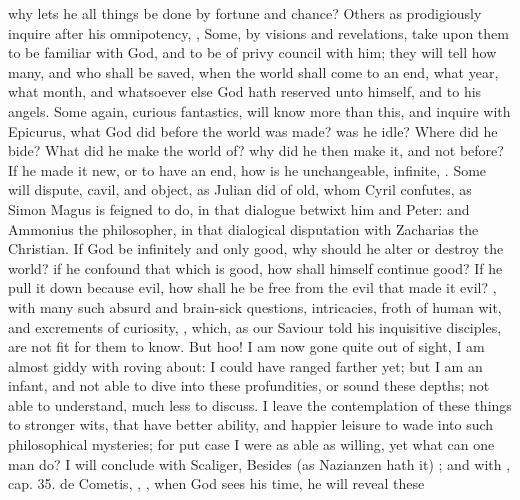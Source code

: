 {why lets he all things be done by fortune and chance? Others as
prodigiously inquire after his omnipotency,  \etc{},  Some, by visions and revelations, take upon them to be
familiar with God, and to be of privy council with him; they will tell
how many, and who shall be saved, when the world shall come to an end,
what year, what month, and whatsoever else God hath reserved unto
himself, and to his angels. Some again, curious fantastics, will know
more than this, and inquire with Epicurus, what God did before
the world was made? was he idle? Where did he bide? What did he make
the world of? why did he then make it, and not before? If he made it
new, or to have an end, how is he unchangeable, infinite, \etc{}. Some will
dispute, cavil, and object, as Julian did of old, whom Cyril confutes,
as Simon Magus is feigned to do, in that dialogue betwixt him and
Peter: and Ammonius the philosopher, in that dialogical disputation
with Zacharias the Christian. If God be infinitely and only good, why
should he alter or destroy the world? if he confound that which is
good, how shall himself continue good? If he pull it down because evil,
how shall he be free from the evil that made it evil? \etc{}, with many
such absurd and brain-sick questions, intricacies, froth of human wit,
and excrements of curiosity, \etc{}, which, as our Saviour told his
inquisitive disciples, are not fit for them to know. But hoo! I am now
gone quite out of sight, I am almost giddy with roving about: I could
have ranged farther yet; but I am an infant, and not able to dive
into these profundities, or sound these depths; not able to understand,
much less to discuss. I leave the contemplation of these things to
stronger wits, that have better ability, and happier leisure to wade
into such philosophical mysteries; for put case I were as able as
willing, yet what can one man do? I will conclude with Scaliger,
 Besides (as
Nazianzen hath it) ; and with \Seneca, \textlatin{cap.
35. de Cometis}, , \etc{}, when God sees his time, he will reveal these
}
